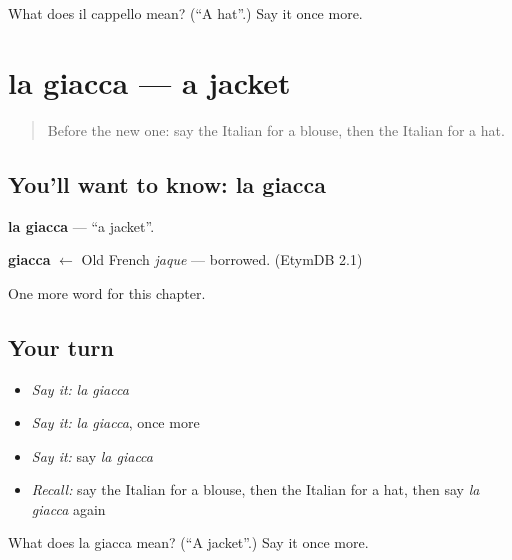 \begin{tcolorbox}[breakable,colback=teal!4,colframe=teal!35!black,title={Before you move on}]
What does il cappello mean? (\textquotedblleft{}A hat\textquotedblright{}.) Say it once more.
\end{tcolorbox}
\section[la giacca]{la giacca — a jacket}

\label{lesson:IT-C105-giacca}



\begin{quote}
Before the new one: say the Italian for a blouse, then the Italian for a hat.
\end{quote}

\subsection*{You'll want to know: la giacca}
\textbf{la giacca} — \textquotedblleft{}a jacket\textquotedblright{}.

\begin{cousinweb}
\textbf{giacca} $\leftarrow$ Old French \emph{jaque} — borrowed. (EtymDB 2.1)
\end{cousinweb}

\begin{grammarlens}[title={What you've built}]
One more word for this chapter.
\end{grammarlens}

\subsection*{Your turn}
\begin{itemize}
\raggedright
  \item \emph{Say it:} \emph{la giacca}
  \item \emph{Say it:} \emph{la giacca}, once more
  \item \emph{Say it:} say \emph{la giacca}
  \item \emph{Recall:} say the Italian for a blouse, then the Italian for a hat, then say \emph{la giacca} again
\end{itemize}

\begin{tcolorbox}[breakable,colback=teal!4,colframe=teal!35!black,title={Before you move on}]
What does la giacca mean? (\textquotedblleft{}A jacket\textquotedblright{}.) Say it once more.
\end{tcolorbox}
